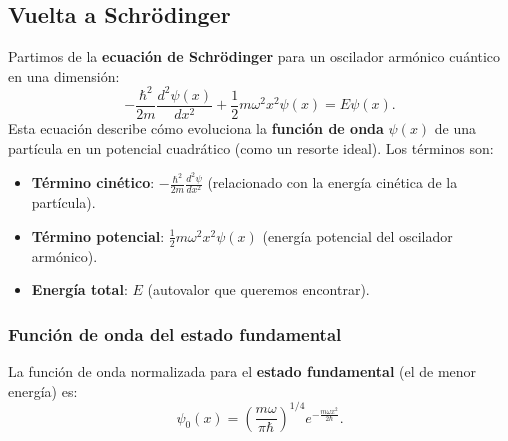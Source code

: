 \documentclass[12pt, a4paper]{article}
\theoremstyle{rioplatense}
\begin{document}





\subsection{Vuelta a Schr\"odinger}

Partimos de la \textbf{ecuación de Schrödinger} para un oscilador armónico cuántico en una dimensión:
\begin{equation*}
    -\frac{\hbar^2}{2m} \frac{d^2\psi(x)}{dx^2} + \frac{1}{2}m\omega^2x^2\psi(x) = E\psi(x).
\end{equation*}
Esta ecuación describe cómo evoluciona la \textbf{función de onda} \(\psi(x)\) de una partícula en un potencial cuadrático (como un resorte ideal). Los términos son:
\begin{itemize}
    \item \textbf{Término cinético}: \(-\frac{\hbar^2}{2m} \frac{d^2\psi}{dx^2}\) (relacionado con la energía cinética de la partícula).
    \item \textbf{Término potencial}: \(\frac{1}{2}m\omega^2x^2\psi(x)\) (energía potencial del oscilador armónico).
    \item \textbf{Energía total}: \(E\) (autovalor que queremos encontrar).
\end{itemize}

\subsubsection{Función de onda del estado fundamental} %

La función de onda normalizada para el \textbf{estado fundamental} (el de menor energía) es:
\begin{equation*}
    \psi_0(x) = \left( \frac{m\omega}{\pi\hbar} \right)^{1/4} e^{-\frac{m\omega x^2}{2\hbar}}.
\end{equation*}
\end{document}
